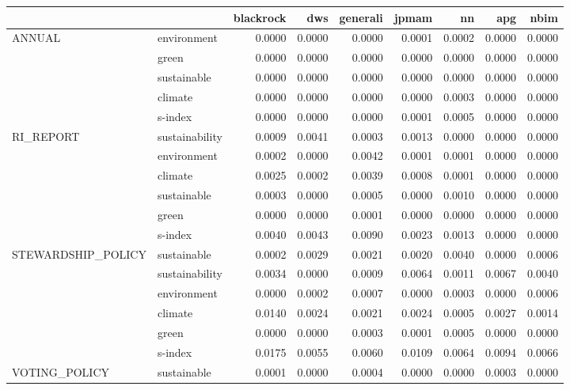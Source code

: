 \begin{tabular}{llrrrrrrr}
\toprule
              &         &  blackrock &    dws &  generali &  jpmam &     nn &    apg &   nbim \\
\midrule
ANNUAL & environment &     0.0000 & 0.0000 &    0.0000 & 0.0001 & 0.0002 & 0.0000 & 0.0000 \\
              & green &     0.0000 & 0.0000 &    0.0000 & 0.0000 & 0.0000 & 0.0000 & 0.0000 \\
              & sustainable &     0.0000 & 0.0000 &    0.0000 & 0.0000 & 0.0000 & 0.0000 & 0.0000 \\
              & climate &     0.0000 & 0.0000 &    0.0000 & 0.0000 & 0.0003 & 0.0000 & 0.0000 \\
              & s-index &     0.0000 & 0.0000 &    0.0000 & 0.0001 & 0.0005 & 0.0000 & 0.0000 \\
RI\_REPORT & sustainability &     0.0009 & 0.0041 &    0.0003 & 0.0013 & 0.0000 & 0.0000 & 0.0000 \\
              & environment &     0.0002 & 0.0000 &    0.0042 & 0.0001 & 0.0001 & 0.0000 & 0.0000 \\
              & climate &     0.0025 & 0.0002 &    0.0039 & 0.0008 & 0.0001 & 0.0000 & 0.0000 \\
              & sustainable &     0.0003 & 0.0000 &    0.0005 & 0.0000 & 0.0010 & 0.0000 & 0.0000 \\
              & green &     0.0000 & 0.0000 &    0.0001 & 0.0000 & 0.0000 & 0.0000 & 0.0000 \\
              & s-index &     0.0040 & 0.0043 &    0.0090 & 0.0023 & 0.0013 & 0.0000 & 0.0000 \\
STEWARDSHIP\_POLICY & sustainable &     0.0002 & 0.0029 &    0.0021 & 0.0020 & 0.0040 & 0.0000 & 0.0006 \\
              & sustainability &     0.0034 & 0.0000 &    0.0009 & 0.0064 & 0.0011 & 0.0067 & 0.0040 \\
              & environment &     0.0000 & 0.0002 &    0.0007 & 0.0000 & 0.0003 & 0.0000 & 0.0006 \\
              & climate &     0.0140 & 0.0024 &    0.0021 & 0.0024 & 0.0005 & 0.0027 & 0.0014 \\
              & green &     0.0000 & 0.0000 &    0.0003 & 0.0001 & 0.0005 & 0.0000 & 0.0000 \\
              & s-index &     0.0175 & 0.0055 &    0.0060 & 0.0109 & 0.0064 & 0.0094 & 0.0066 \\
VOTING\_POLICY & sustainable &     0.0001 & 0.0000 &    0.0004 & 0.0000 & 0.0000 & 0.0003 & 0.0000 \\

\end{tabular}
